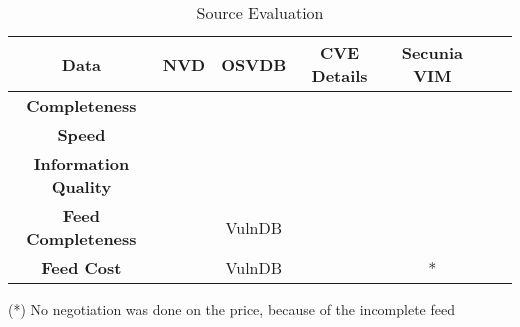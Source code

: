     \begin{table}
\begin{center}
    \begin{tabular}{ | c || c | c | c | c | c | c |}
    
    \hline
	 
      Data & \textbf{NVD}  &  \textbf{OSVDB} & \textbf{CVE Details} & \textbf{Secunia VIM} 
	\\ 
	\hline  
	\textbf{Completeness} & \multicolumn{1}{c|}{\cellcolor{yellow!25}} & \multicolumn{1}{c|}{\cellcolor{green!25}}
	& \multicolumn{1}{c|}{\cellcolor{yellow!25}}& \multicolumn{1}{c|}{\cellcolor{yellow!25}}
    \\ 
	\hline   
	 \textbf{Speed} & \multicolumn{1}{c|}{\cellcolor{green!25}} & \multicolumn{1}{c|}{\cellcolor{green!25}}
	& \multicolumn{1}{c|}{\cellcolor{green!25}}& \multicolumn{1}{c|}{\cellcolor{green!25}}
	  \\ 
	\hline
	 \textbf{Information Quality} & \multicolumn{1}{c|}{\cellcolor{green!25}} & \multicolumn{1}{c|}{\cellcolor{green!25}}
	& \multicolumn{1}{c|}{\cellcolor{green!25}}& \multicolumn{1}{c|}{\cellcolor{green!25}}
	  \\ 
	\hline
	 \textbf{Feed Completeness} & \multicolumn{1}{c|}{\cellcolor{green!25}} & \multicolumn{1}{c|}{\cellcolor{green!25}VulnDB}
	& \multicolumn{1}{c|}{\cellcolor{red!25}}& \multicolumn{1}{c|}{\cellcolor{red!25}}
	 \\
	 \hline
	 
	 \textbf{Feed Cost} & \multicolumn{1}{c|}{\cellcolor{green!25}} & \multicolumn{1}{c|}{\cellcolor{red!25}VulnDB}
	& \multicolumn{1}{c|}{\cellcolor{green!25}}& \multicolumn{1}{c|}{\cellcolor{white!25}*}
	 \\
	 \hline
     
\end{tabular}
    \caption{Source Evaluation}
    \label{table:source_evaluation}
    \footnotesize{(*) No negotiation was done on the price, because of the incomplete feed}
   \end{center}
    \end{table}

